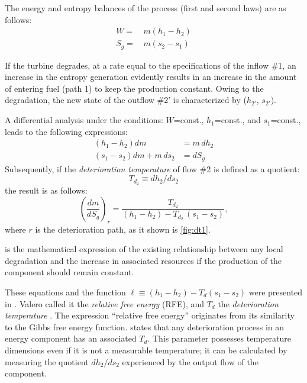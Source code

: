 \documentclass[energies,article,submit,moreauthors,pdftex]{Definitions/mdpi}
\begin{document}
The energy and entropy balances of the process (first and second laws) are as follows:
\begin{align}
W=&\,m\left(h_1-h_2\right)\\
S_g=&\,m\left(s_2-s_1\right)
\end{align}

If the turbine degrades, at a rate equal to the specifications of the inflow \#1, an increase in the entropy generation evidently results in an increase in the amount of entering fuel (path 1) to keep the production constant. Owing to the degradation, the new state of the outflow \#2' is characterized by  ($h_{2'}$, $s_{2'}$).

A differential analysis under the conditions: $W$=const., $h_1$=const., and $s_1$=const., leads to the following expressions:
\begin{align}
\left(h_1-h_2\right) dm &= m \, dh_2\\
\left(s_1-s_2\right) dm + m \, ds_2 &= dS_g
\end{align}
Subsequently, if the \emph{deterioration temperature} of flow \#2 is defined as a quotient:
\[
T_{d_2}\equiv dh_2/ds_2
\]
the result is as follows:
\begin{equation}
\left(\frac{dm}{dS_g}\right)_r =\frac{T_{d_2}}{\left(h_1-h_2\right)-T_{d_2}\,\left(s_1-s_2\right)},
\label{eq:dt2}
\end{equation}
where $r$ is the deterioration path, as it shown is \cref{fig:dt1}.

 is the mathematical expression of the existing relationship between any local degradation and the increase in associated resources if the production of the component should remain constant.

These equations and the function $\ell\equiv (h_1-h_2) - T_d (s_1 - s_2)$ were presented in \cite{Valero1992b}. Valero called it the \emph{relative free energy} (RFE), and $T_d$ the \emph{deterioration temperature} \cite{Royo1994,Royo1995}. The expression “relative free energy” originates from its similarity to the Gibbs free energy function.  states that any deterioration process in an energy component has an associated $T_d$. This parameter possesses temperature dimensions even if it is not a measurable temperature; it can be calculated by measuring the quotient $dh_2/ds_2$ experienced by the output flow of the component.
\end{document}
